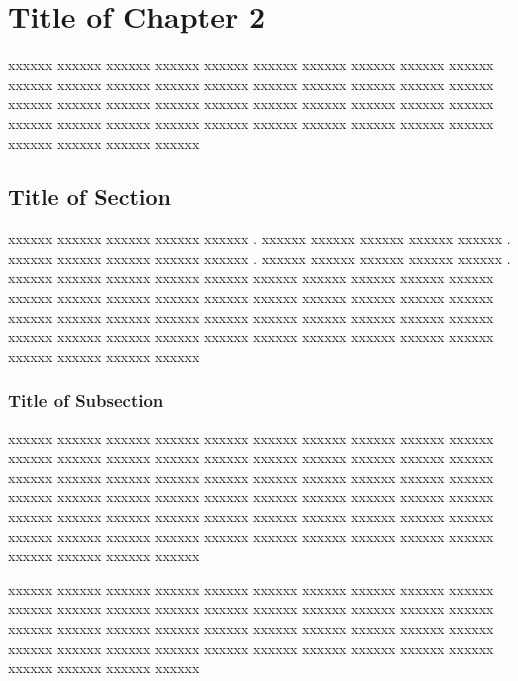 
\chapter{Title of Chapter 2}
\graphicspath{{Chapter_1/Vector/}{Chapter_1/}}

xxxxxx xxxxxx xxxxxx xxxxxx xxxxxx xxxxxx xxxxxx xxxxxx xxxxxx xxxxxx xxxxxx xxxxxx xxxxxx xxxxxx xxxxxx xxxxxx xxxxxx xxxxxx xxxxxx xxxxxx xxxxxx xxxxxx xxxxxx xxxxxx xxxxxx xxxxxx xxxxxx xxxxxx xxxxxx xxxxxx xxxxxx xxxxxx xxxxxx xxxxxx xxxxxx xxxxxx xxxxxx xxxxxx xxxxxx xxxxxx xxxxxx xxxxxx xxxxxx xxxxxx 

\section{Title of Section}

xxxxxx xxxxxx xxxxxx xxxxxx xxxxxx \cite{ErdelyiBook}. xxxxxx xxxxxx xxxxxx xxxxxx xxxxxx \cite{ErdelyiBook}. xxxxxx xxxxxx xxxxxx xxxxxx xxxxxx \cite{	JakesBook}. xxxxxx xxxxxx xxxxxx xxxxxx xxxxxx \cite{	ExtonBook}. xxxxxx xxxxxx xxxxxx xxxxxx xxxxxx xxxxxx xxxxxx xxxxxx xxxxxx xxxxxx xxxxxx xxxxxx xxxxxx xxxxxx xxxxxx xxxxxx xxxxxx xxxxxx xxxxxx xxxxxx xxxxxx xxxxxx xxxxxx xxxxxx xxxxxx xxxxxx xxxxxx xxxxxx xxxxxx xxxxxx xxxxxx xxxxxx xxxxxx xxxxxx xxxxxx xxxxxx xxxxxx xxxxxx xxxxxx xxxxxx xxxxxx xxxxxx xxxxxx xxxxxx 

\subsection{Title of Subsection}

xxxxxx xxxxxx xxxxxx xxxxxx \cite{	SrivastavaBook}xxxxxx xxxxxx xxxxxx xxxxxx \cite{	PrudnikovBookv4}xxxxxx xxxxxx xxxxxx xxxxxx \cite{	LeeBook1998}	xxxxxx xxxxxx xxxxxx xxxxxx \cite{	RyzhikBook}xxxxxx xxxxxx xxxxxx xxxxxx xxxxxx xxxxxx xxxxxx xxxxxx \cite{	HoytApr1947} xxxxxx xxxxxx xxxxxx xxxxxx xxxxxx xxxxxx xxxxxx xxxxxx xxxxxx xxxxxx xxxxxx xxxxxx xxxxxx xxxxxx xxxxxx xxxxxx xxxxxx xxxxxx xxxxxx xxxxxx xxxxxx xxxxxx xxxxxx xxxxxx xxxxxx xxxxxx xxxxxx xxxxxx xxxxxx xxxxxx xxxxxx xxxxxx xxxxxx xxxxxx xxxxxx xxxxxx xxxxxx xxxxxx xxxxxx xxxxxx 



xxxxxx xxxxxx xxxxxx xxxxxx xxxxxx xxxxxx xxxxxx xxxxxx xxxxxx xxxxxx xxxxxx xxxxxx xxxxxx xxxxxx xxxxxx xxxxxx xxxxxx xxxxxx xxxxxx xxxxxx xxxxxx xxxxxx xxxxxx xxxxxx xxxxxx xxxxxx xxxxxx xxxxxx xxxxxx xxxxxx xxxxxx xxxxxx xxxxxx xxxxxx xxxxxx xxxxxx xxxxxx xxxxxx xxxxxx xxxxxx xxxxxx xxxxxx xxxxxx xxxxxx 

